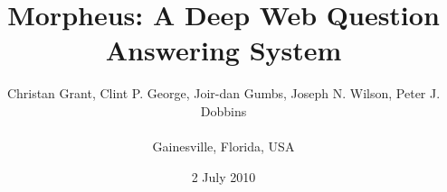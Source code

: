 \documentclass{sig-alternate}
\begin{document}
%



\title{{\ttlit Morpheus}: A Deep Web Question Answering System}

%
%
%
%
%

\author{
	 \alignauthor Christan Grant, Clint P. George, Joir-dan Gumbs, Joseph N. Wilson, Peter J. Dobbins \\
	  \\ \affaddr
{ Gainesville, Florida, USA} \\
}

\date{2 July 2010}


\maketitle
\end{document}
